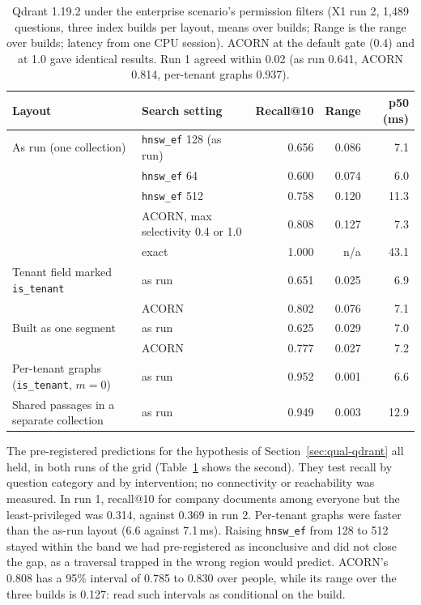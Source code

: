 \begin{table}[tbp]
\centering
\footnotesize
\begin{tabular}{@{}llrrr@{}}
\toprule
Layout & Search setting & Recall@10 & Range & p50 (ms) \\
\midrule
As run (one collection) & \texttt{hnsw\_ef} 128 (as run) & 0.656 & 0.086 & 7.1 \\
 & \texttt{hnsw\_ef} 64 & 0.600 & 0.074 & 6.0 \\
 & \texttt{hnsw\_ef} 512 & 0.758 & 0.120 & 11.3 \\
 & ACORN, max selectivity 0.4 or 1.0 & 0.808 & 0.127 & 7.3 \\
 & exact & 1.000 & n/a & 43.1 \\
Tenant field marked \texttt{is\_tenant} & as run & 0.651 & 0.025 & 6.9 \\
 & ACORN & 0.802 & 0.076 & 7.1 \\
Built as one segment & as run & 0.625 & 0.029 & 7.0 \\
 & ACORN & 0.777 & 0.027 & 7.2 \\
Per-tenant graphs (\texttt{is\_tenant}, $m = 0$) & as run & 0.952 & 0.001 & 6.6 \\
Shared passages in a separate collection & as run & 0.949 & 0.003 & 12.9 \\
\bottomrule
\end{tabular}
\caption{Qdrant 1.19.2 under the enterprise scenario's permission filters (X1 run 2, 1,489
questions, three index builds per layout, means over builds; Range is the range over builds; latency from
one CPU session). ACORN at the default gate (0.4) and at 1.0 gave identical results. Run 1 agreed within 0.02
(as run 0.641, ACORN 0.814, per-tenant graphs 0.937).}
\label{tab:qual-qdrant}
\end{table}

The pre-registered predictions for the hypothesis of Section~\ref{sec:qual-qdrant} all held, in both runs of the grid
(Table~\ref{tab:qual-qdrant} shows the second). They test recall by question category and by intervention; no connectivity or reachability was measured. In run 1, recall@10 for company documents among everyone but the least-privileged was 0.314, against 0.369 in run 2. Per-tenant graphs were faster than the as-run layout (6.6 against 7.1\,ms). Raising \texttt{hnsw\_ef} from 128 to 512 stayed
within the band we had pre-registered as inconclusive and did not close the gap, as
a traversal trapped in the wrong region would predict. ACORN's 0.808 has a 95\% interval of 0.785 to 0.830 over people, while its range over the three builds is 0.127: read such intervals as conditional on the build.

